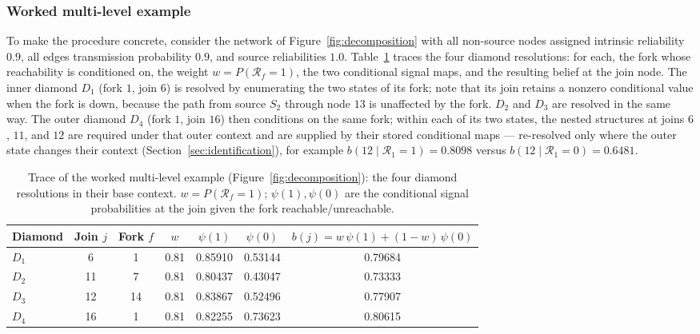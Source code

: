 \documentclass[preprint,12pt]{elsarticle}
\theoremstyle{definition}
\begin{document}
\subsubsection{Worked multi-level example}\label{sec:worked}

To make the procedure concrete, consider the network of Figure~\ref{fig:decomposition} with all
non-source nodes assigned intrinsic reliability $0.9$, all edges transmission probability $0.9$, and
source reliabilities $1.0$. Table~\ref{tab:trace} traces the four diamond resolutions: for each, the
fork whose reachability is conditioned on, the weight $w=P(\mathcal{R}_f=1)$, the two conditional signal
maps, and the resulting belief at the join node. The inner diamond $D_1$ (fork $1$, join $6$) is
resolved by enumerating the two states of its fork; note that its join retains a nonzero conditional
value when the fork is down, because the path from source $S_2$ through node $13$ is unaffected by the
fork. $D_2$ and $D_3$ are resolved in the same way. The outer diamond $D_4$ (fork $1$, join $16$) then
conditions on the same fork; within each of its two states, the nested structures at joins $6$, $11$,
and $12$ are required under that outer context and are supplied by their stored conditional maps ---
re-resolved only where the outer state changes their context (Section~\ref{sec:identification}), for
example $b(12\mid \mathcal{R}_1{=}1)=0.8098$ versus $b(12\mid \mathcal{R}_1{=}0)=0.6481$.

\begin{table}[t]
\centering\small
\caption{Trace of the worked multi-level example (Figure~\ref{fig:decomposition}): the four diamond
resolutions in their base context. $w=P(\mathcal{R}_f=1)$; $\psi(1),\psi(0)$ are the conditional signal
probabilities at the join given the fork reachable/unreachable.}
\label{tab:trace}
\begin{tabular}{lcccccc}
\toprule
Diamond & Join $j$ & Fork $f$ & $w$ & $\psi(1)$ & $\psi(0)$ & $b(j)=w\,\psi(1)+(1{-}w)\,\psi(0)$\\
\midrule
$D_1$ & 6  & 1  & 0.81 & 0.85910 & 0.53144 & 0.79684\\
$D_2$ & 11 & 7  & 0.81 & 0.80437 & 0.43047 & 0.73333\\
$D_3$ & 12 & 14 & 0.81 & 0.83867 & 0.52496 & 0.77907\\
$D_4$ & 16 & 1  & 0.81 & 0.82255 & 0.73623 & 0.80615\\
\bottomrule
\end{tabular}
\end{table}
\end{document}
